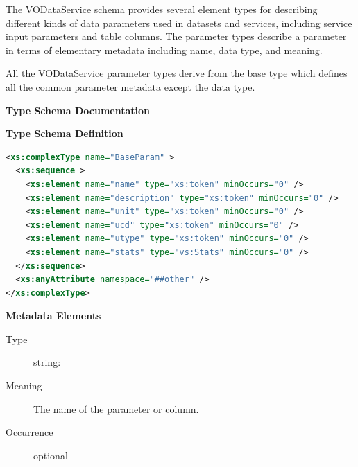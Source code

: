 \documentclass[11pt,a4paper]{ivoa}
\begin{document}
The VODataService schema provides several element types for describing
different kinds of data parameters used in datasets and services,
including service input parameters and table columns.  The parameter
types describe a parameter in terms of elementary metadata
including name, data type, and meaning.


All the VODataService parameter types derive from the base type
 which defines all the common parameter
metadata except the data type.


\begin{generated}
\begingroup
        \renewcommand*\descriptionlabel[1]{%
        \hbox to 5.5em{\emph{#1}\hfil}}\vspace{2ex}\noindent\textbf{ Type Schema Documentation}



\vspace{1ex}\noindent\textbf{ Type Schema Definition}

\begin{lstlisting}[language=XML,basicstyle=\footnotesize]
<xs:complexType name="BaseParam" >
  <xs:sequence >
    <xs:element name="name" type="xs:token" minOccurs="0" />
    <xs:element name="description" type="xs:token" minOccurs="0" />
    <xs:element name="unit" type="xs:token" minOccurs="0" />
    <xs:element name="ucd" type="xs:token" minOccurs="0" />
    <xs:element name="utype" type="xs:token" minOccurs="0" />
    <xs:element name="stats" type="vs:Stats" minOccurs="0" />
  </xs:sequence>
  <xs:anyAttribute namespace="##other" />
</xs:complexType>
\end{lstlisting}

\vspace{0.5ex}\noindent\textbf{ Metadata Elements}

\begingroup\small\begin{bigdescription}\item[Element \xmlel{name}]
\begin{description}
\item[Type] string: 
\item[Meaning] The name of the parameter or column.
\item[Occurrence] optional


\end{description}
\end{bigdescription}
\end{generated}
\end{document}
